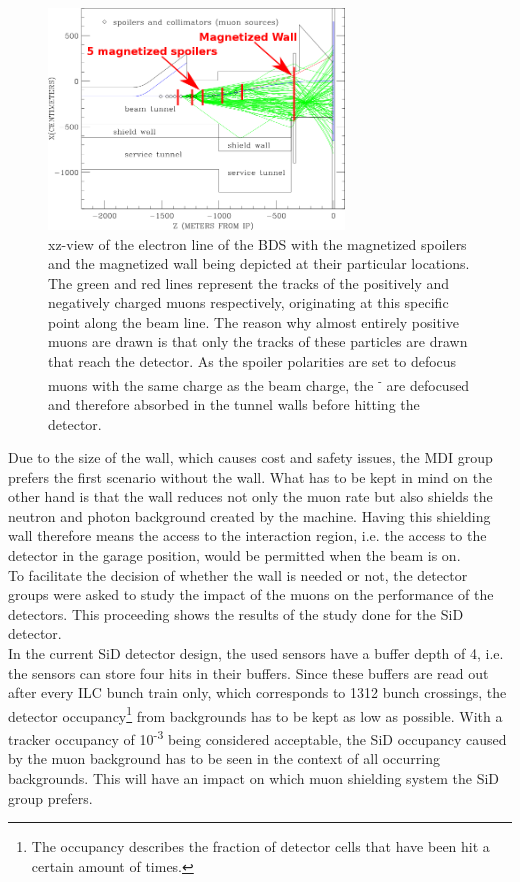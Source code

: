 \documentclass[12pt]{article}
\begin{document}
\begin{figure}
    \centering
    \includegraphics[width=0.7\textwidth]{figures/BDS_Tunnel_Spoilers+Wall.png}
    \caption[BDS tunnel with the spoiler and wall positions]{
    xz-view of the electron line of the BDS with the magnetized spoilers and the magnetized wall being depicted at their particular locations.
    The green and red lines represent the tracks of the positively and negatively charged muons respectively, originating at this specific point along the beam line.
    The reason why almost entirely positive muons are drawn is that only the tracks of these particles are drawn that reach the detector.
    As the spoiler polarities are set to defocus muons with the same charge as the beam charge, the \textmu\textsuperscript{-} are defocused and therefore absorbed in the tunnel walls before hitting the detector.
    }
    \label{fig:Spoilers_Wall_Locations}
\end{figure}

Due to the size of the wall, which causes cost and safety issues, the MDI group prefers the first scenario without the wall.
What has to be kept in mind on the other hand is that the wall reduces not only the muon rate but also shields the neutron and photon background created by the machine.
Having this shielding wall therefore means the access to the interaction region, i.e. the access to the detector in the garage position, would be permitted when the beam is on.
\\
To facilitate the decision of whether the wall is needed or not, the detector groups were asked to study the impact of the muons on the performance of the detectors.
This proceeding shows the results of the study done for the SiD detector.\\
In the current SiD detector design, the used sensors have a buffer depth of 4, i.e. the sensors can store four hits in their buffers.
Since these buffers are read out after every ILC bunch train only, which corresponds to 1312 bunch crossings, the detector occupancy\footnote{The occupancy describes the fraction of detector cells that have been hit a certain amount of times.} from backgrounds has to be kept as low as possible.
With a tracker occupancy of 10\textsuperscript{-3} being considered acceptable, the SiD occupancy caused by the muon background has to be seen in the context of all occurring backgrounds.
This will have an impact on which muon shielding system the SiD group prefers.
\end{document}
